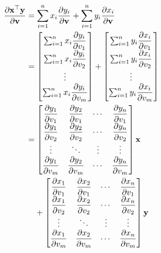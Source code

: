 \documentclass{article}
\newcommand{\trans}{\top}
\begin{document}
\begin{align}
    \dfrac{\partial \mathbf{x}^\trans \mathbf{y}}{\partial \mathbf{v}} & = \sum_{i=1}^{n} x_i\dfrac{\partial y_i}{\partial \mathbf{v}} + \sum_{i=1}^{n} y_i\dfrac{\partial x_i}{\partial \mathbf{v}} \\
    & = \begin{bmatrix}
        \sum_{i=1}^{n} x_i\dfrac{\partial y_i}{\partial v_1} \\
        \sum_{i=1}^{n} x_i\dfrac{\partial y_i}{\partial v_2} \\
        \vdots \\
        \sum_{i=1}^{n} x_i\dfrac{\partial y_i}{\partial v_m} \\
    \end{bmatrix} +
    \begin{bmatrix}
        \sum_{i=1}^{n} y_i\dfrac{\partial x_i}{\partial v_1} \\
        \sum_{i=1}^{n} y_i\dfrac{\partial x_i}{\partial v_2} \\
        \vdots \\
        \sum_{i=1}^{n} y_i\dfrac{\partial x_i}{\partial v_m}
    \end{bmatrix} \\
    & = \begin{bmatrix}
        \dfrac{\partial y_1}{\partial v_1} & \dfrac{\partial y_2}{\partial v_1} & \cdots & \dfrac{\partial y_n}{\partial v_1} \\
        \dfrac{\partial y_1}{\partial v_2} & \dfrac{\partial y_2}{\partial v_2} & \cdots & \dfrac{\partial y_n}{\partial v_2} \\
        \vdots & \ddots & \vdots & \vdots \\
        \dfrac{\partial y_1}{\partial v_m} & \dfrac{\partial y_2}{\partial v_m} & \cdots & \dfrac{\partial y_n}{\partial v_m} \\
    \end{bmatrix} \mathbf{x} \\
    & \hspace{2.5ex} + \begin{bmatrix}
        \dfrac{\partial x_1}{\partial v_1} & \dfrac{\partial x_2}{\partial v_1} & \cdots & \dfrac{\partial x_n}{\partial v_1} \\
        \dfrac{\partial x_1}{\partial v_2} & \dfrac{\partial x_2}{\partial v_2} & \cdots & \dfrac{\partial x_n}{\partial v_2} \\
        \vdots & \ddots & \vdots & \vdots \\
        \dfrac{\partial x_1}{\partial v_m} & \dfrac{\partial x_2}{\partial v_m} & \cdots & \dfrac{\partial x_n}{\partial v_m} \\
    \end{bmatrix} \mathbf{y}
\end{align}
\end{document}
